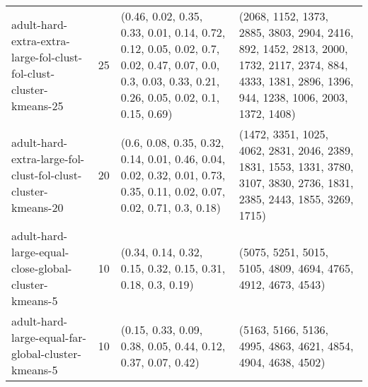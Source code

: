\begin{longtable}{llll}
\bottomrule
\endlastfoot
                                           adult-hard-extra-extra-large-fol-clust-fol-clust-cluster-kmeans-25 &             25 &                                                                                                                                                        (0.46, 0.02, 0.35, 0.33, 0.01, 0.14, 0.72, 0.12, 0.05, 0.02, 0.7, 0.02, 0.47, 0.07, 0.0, 0.3, 0.03, 0.33, 0.21, 0.26, 0.05, 0.02, 0.1, 0.15, 0.69) &                                                                                                                                                       (2068, 1152, 1373, 2885, 3803, 2904, 2416, 892, 1452, 2813, 2000, 1732, 2117, 2374, 884, 4333, 1381, 2896, 1396, 944, 1238, 1006, 2003, 1372, 1408) \\
                                                 adult-hard-extra-large-fol-clust-fol-clust-cluster-kmeans-20 &             20 &                                                                                                                                                                                    (0.6, 0.08, 0.35, 0.32, 0.14, 0.01, 0.46, 0.04, 0.02, 0.32, 0.01, 0.73, 0.35, 0.11, 0.02, 0.07, 0.02, 0.71, 0.3, 0.18) &                                                                                                                                                                                  (1472, 3351, 1025, 4062, 2831, 2046, 2389, 1831, 1553, 1331, 3780, 3107, 3830, 2736, 1831, 2385, 2443, 1855, 3269, 1715) \\
                                                         adult-hard-large-equal-close-global-cluster-kmeans-5 &             10 &                                                                                                                                                                                                                                               (0.34, 0.14, 0.32, 0.15, 0.32, 0.15, 0.31, 0.18, 0.3, 0.19) &                                                                                                                                                                                                                                              (5075, 5251, 5015, 5105, 4809, 4694, 4765, 4912, 4673, 4543) \\
                                                           adult-hard-large-equal-far-global-cluster-kmeans-5 &             10 &                                                                                                                                                                                                                                              (0.15, 0.33, 0.09, 0.38, 0.05, 0.44, 0.12, 0.37, 0.07, 0.42) &                                                                                                                                                                                                                                              (5163, 5166, 5136, 4995, 4863, 4621, 4854, 4904, 4638, 4502) \\

\end{longtable}
